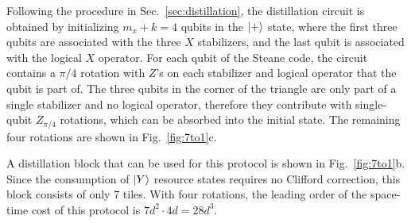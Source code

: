 \documentclass[prx,aps,letterpaper,twocolumn,allowfontchageintitle=true,accepted=2019-02-01]{quantumarticle}
\begin{document}
Following the procedure in Sec.~\ref{sec:distillation}, the distillation circuit is obtained by initializing $m_x+k=4$ qubits in the $\ket{+}$ state, where the first three qubits are associated with the three $X$ stabilizers, and the last qubit is associated with the logical $X$ operator. For each qubit of the Steane code, the circuit contains a $\pi/4$ rotation with $Z$'s on each stabilizer and logical operator that the qubit is part of. The three qubits in the corner of the triangle are only part of a single stabilizer and no logical operator, therefore they contribute with  single-qubit  $Z_{\pi/4}$ rotations, which can be absorbed into  \linebreak \newpage \noindent  the  initial state. The remaining four rotations are shown in  Fig.~\ref{fig:7to1}c. 



A distillation block that can be used for this protocol  is shown in Fig.~\ref{fig:7to1}b. Since the consumption of $\ket{Y}$   resource states requires no Clifford correction, this block consists of only 7 tiles. With four rotations, the leading order of the space-time cost of this protocol is $7d^2\cdot 4 d = 28d^3$.
\end{document}
